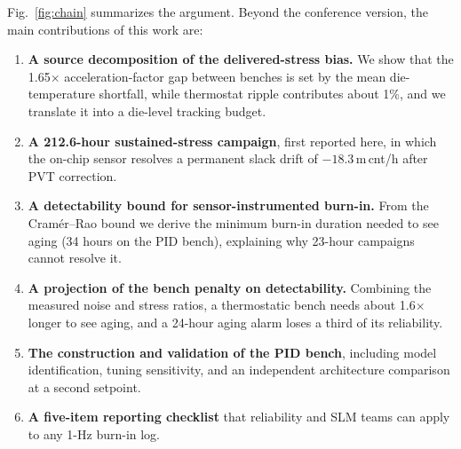\documentclass[10pt,twocolumn]{article}
\begin{document}
Fig.~\ref{fig:chain} summarizes the argument. Beyond the conference version, the main contributions of this work are:
\begin{enumerate}\setlength{\itemsep}{1pt}\setlength{\parsep}{0pt}
\item \textbf{A source decomposition of the delivered-stress bias.} We show that the 1.65$\times$ acceleration-factor gap between benches is set by the mean die-temperature shortfall, while thermostat ripple contributes about 1\%, and we translate it into a die-level tracking budget.
\item \textbf{A 212.6-hour sustained-stress campaign}, first reported here, in which the on-chip sensor resolves a permanent slack drift of $-18.3$\,m\,cnt/h after PVT correction.
\item \textbf{A detectability bound for sensor-instrumented burn-in.} From the Cram\'er--Rao bound we derive the minimum burn-in duration needed to see aging (34 hours on the PID bench), explaining why 23-hour campaigns cannot resolve it.
\item \textbf{A projection of the bench penalty on detectability.} Combining the measured noise and stress ratios, a thermostatic bench needs about 1.6$\times$ longer to see aging, and a 24-hour aging alarm loses a third of its reliability.
\item \textbf{The construction and validation of the PID bench}, including model identification, tuning sensitivity, and an independent architecture comparison at a second setpoint.
\item \textbf{A five-item reporting checklist} that reliability and SLM teams can apply to any 1-Hz burn-in log.
\end{enumerate}
\end{document}
